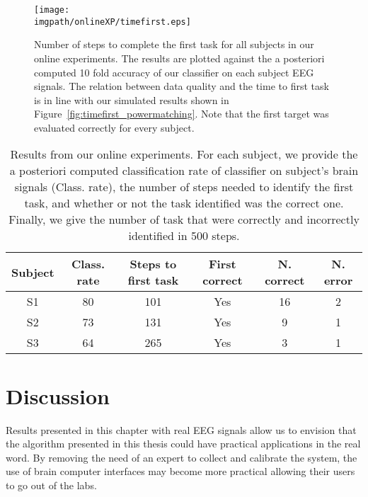 \begin{figure}[!htbp]
\centering
\texttt{[image: \\imgpath/onlineXP/timefirst.eps]}
\caption{Number of steps to complete the first task for all subjects in our online experiments. The results are plotted against the a posteriori computed 10 fold accuracy of our classifier on each subject EEG signals. The relation between data quality and the time to first task is in line with our simulated results shown in Figure~\ref{fig:timefirst_powermatching}. Note that the first target was evaluated correctly for every subject.}
\label{fig:timefirst_online}
\end{figure} 


\begin{table}
\centering
{}
\begin{tabular}{c c c c c c}
    Subject & Class. rate & Steps to first task & First correct & N. correct & N. error\\ \hline
    S1 & 80 & 101 & Yes & 16 & 2\\ 
    S2 & 73 & 131 & Yes & 9 & 1\\
    S3 & 64 & 265 & Yes & 3 & 1\\
\end{tabular}
\caption{Results from our online experiments. For each subject, we provide the a posteriori computed classification rate of classifier on subject's brain signals (Class. rate), the number of steps needed to identify the first task, and whether or not the task identified was the correct one. Finally, we give the number of task that were correctly and incorrectly identified in 500 steps.} 
\label{tab:onlineXPsummary}
\end{table}


\section{Discussion}

Results presented in this chapter with real EEG signals allow us to envision that the algorithm presented in this thesis could have practical applications in the real word. By removing the need of an expert to collect and calibrate the system, the use of brain computer interfaces may become more practical allowing their users to go out of the labs.

